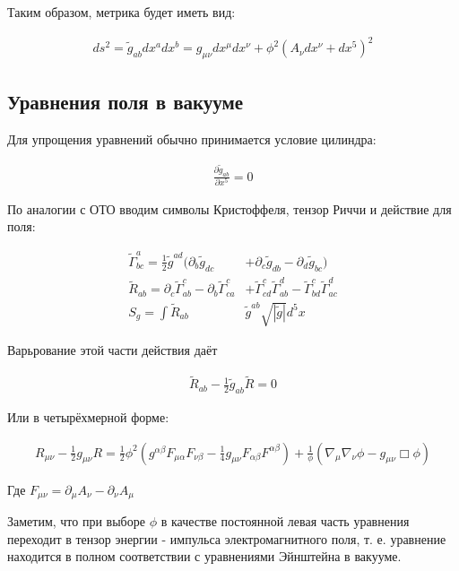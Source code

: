 \documentclass[a4paper,14pt]{article}
\begin{document}
	Таким образом, метрика будет иметь вид:

	\begin{align*}
	 	ds^2 = \tilde g_{ab} dx^a dx^b = g_{\mu \nu} dx^{\mu} dx^{\nu} + \phi^2 (A_{\nu} dx^{\nu} + dx^5)^2
	\end{align*}

\subsection*{Уравнения поля в вакууме}

	Для упрощения уравнений обычно принимается условие цилиндра:

	\begin{align*}
	 	\frac{ \partial \tilde g_{ab} }{\partial x^5} = 0
	\end{align*}

	По аналогии с ОТО вводим символы Кристоффеля, тензор Риччи и действие для поля:

	\begin{align*}
	 	\tilde{\Gamma}_{bc}^a= \frac{1}{2} \tilde g^{ad} ( \partial_b \tilde g_{dc}& + \partial_c \tilde g_{db} - \partial_d \tilde g_{bc}) \\
	 	\tilde{R}_{ab} = \partial_c \tilde{\Gamma}_{ab}^c - \partial_b \tilde{\Gamma}_{ca}^c & + \tilde{\Gamma}_{cd}^c \tilde{\Gamma}_{ab}^d - \tilde{\Gamma}_{bd}^c \tilde{\Gamma}_{ac}^d \\
	 	S_g = \int \tilde{R}_{ab} & \tilde{g}^{ab} \sqrt{ |\tilde{g}| } d^5 x
	\end{align*}

	Варьрование этой части действия даёт

	\begin{align*}
	 	\tilde{R}_{ab} - \frac{1}{2} \tilde g_{ab} \tilde R = 0
	\end{align*}

	Или в четырёхмерной форме:

	\begin{align*}
	 	{R}_{\mu \nu} - \frac{1}{2} g_{\mu \nu} R = \frac{1}{2} \phi^2 ( g^{\alpha \beta } F_{\mu \alpha} F_{\nu \beta} - \frac{1}{4} g_{\mu \nu} F_{\alpha \beta} F^{\alpha \beta} ) + \frac{1}{\phi}(\nabla_{\mu} \nabla_{\nu} \phi - g_{\mu \nu} \Box \phi)
	\end{align*}

	Где $ F_{\mu \nu} = \partial_{\mu} A_{\nu} - \partial_{\nu} A_{\mu} $

	Заметим, что при выборе $\phi$ в качестве постоянной левая часть уравнения переходит в тензор энергии - импульса электромагнитного поля, т. е. уравнение находится в полном соответствии с уравнениями Эйнштейна в вакууме.
\end{document}
